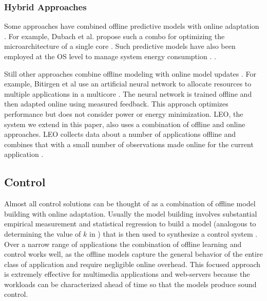 \subsubsection{Hybrid Approaches}
Some approaches have combined offline predictive models with online
adaptation
\cite{Zhang2012,packandcap,Winter2010,dubach2010,Koala,Cinder,
  wu2012inferred}.  For example, Dubach et al.  propose such a combo
for optimizing the microarchitecture of a single core
\cite{dubach2010}.  Such predictive models have also been employed at
the OS level to manage system energy consumption \cite{Koala,Cinder}.
\cite{wu2012inferred}.


Still other approaches combine offline modeling with online model
updates \cite{JouleGuard,Bitirgen2008,Ipek}.  For example, Bitirgen et
al use an artificial neural network to allocate resources to multiple
applications in a multicore \cite{Bitirgen2008}.  The neural network
is trained offline and then adapted online using measured feedback.
This approach optimizes performance but does not consider power or
energy minimization.  LEO, the system we extend in this paper, also
uses a combination of offline and online approaches.  LEO collects
data about a number of applications offline and combines that with a
small number of observations made online for the current application
\cite{LEO}.

\subsection{Control}
Almost all control solutions can be thought of as a combination of
offline model building with online adaptation.  Usually the model
building involves substantial empirical measurement and statistical
regression to build a model (analogous to determining the value of $k$
in ) that is then used to synthesize a control system
\cite{Wu2004,TCST,Chen2011,PTRADE,POET,ControlWare,Agilos,Rajkumar,Sojka,Raghavendra2008}.
Over a narrow range of applications the combination of offline
learning and control works well, as the offline models capture the
general behavior of the entire class of application and require
negligible online overhead.  This focused approach is extremely
effective for multimedia applications
\cite{grace2,flinn99,flinn2004,xtune,TCST} and web-servers
\cite{Horvarth,LuEtAl-2006a,SunDaiPan-2008a} because the workloads can
be characterized ahead of time so that the models produce sound
control.


